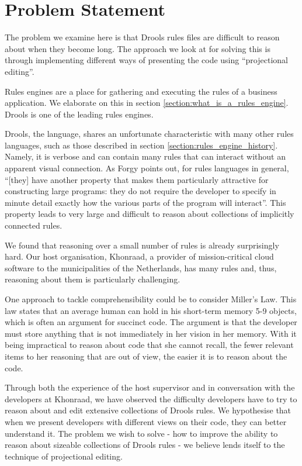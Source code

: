 \section{Problem Statement}
\label{section:problem_statement}

The problem we examine here is that Drools rules files are difficult to reason about when they become long.
The approach we look at for solving this is through implementing different ways of presenting the code using ``projectional editing''.

Rules engines are a place for gathering and executing the rules of a business application.
We elaborate on this in section \ref{section:what_is_a_rules_engine}.
Drools is one of the leading rules engines.

Drools, the language, shares an unfortunate characteristic with many other rules languages, such as those described in section \ref{section:rules_engine_history}.
Namely, it is verbose and can contain many rules that can interact without an apparent visual connection.
As Forgy\cite{forgy1989rete} points out, for rules languages in general, ``[they] have another property that makes them particularly attractive for constructing large programs: they do not require the developer to specify in minute detail exactly how the various parts of the program will interact''.
This property leads to very large and difficult to reason about collections of implicitly connected rules.

We found that reasoning over a small number of rules is already surprisingly hard.
Our host organisation, Khonraad, a provider of mission-critical cloud software to the municipalities of the Netherlands, has many rules and, thus, reasoning about them is particularly challenging.

One approach to tackle comprehensibility could be to consider Miller's Law\cite{miller1956magical}.
This law states that an average human can hold in his short-term memory 5-9 objects, which is often an argument for succinct code.
The argument is that the developer must store anything that is not immediately in her vision in her memory.
With it being impractical to reason about code that she cannot recall, the fewer relevant items to her reasoning that are out of view, the easier it is to reason about the code.

Through both the experience of the host supervisor and in conversation with the developers at Khonraad, we have observed the difficulty developers have to try to reason about and edit extensive collections of Drools rules.
We hypothesise that when we present developers with different views on their code, they can better understand it.
The problem we wish to solve - how to improve the ability to reason about sizeable collections of Drools rules - we believe lends itself to the technique of projectional editing.

